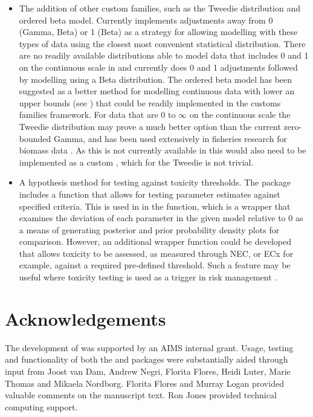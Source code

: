 \documentclass[
  shortnames]{jss}
\begin{document}
\begin{itemize}
\item
  The addition of other custom families, such as the Tweedie distribution and ordered beta model. Currently  implements adjustments away from 0 (Gamma, Beta) or 1 (Beta) as a strategy for allowing modelling with these types of data using the closest most convenient statistical distribution.
  There are no readily available distributions able to model data that includes 0 and 1 on the continuous scale in  and  currently does 0 and 1 adjustments followed by modelling using a Beta distribution. The ordered beta model has been suggested as a better method for modelling continuous data with lower an upper bounds (see \citet{Kubinec}) that could be readily implemented in the  customs families framework.
  For data that are 0 to \(\infty\) on the continuous scale the Tweedie distribution may prove a much better option than the current zero-bounded Gamma, and has been used extensively in fisheries research for biomass data \citep{Shono2008}. As this  is not currently available in  this would also need to be implemented as a custom , which for the Tweedie is not trivial.
\item
  A hypothesis method for testing against toxicity thresholds. The  package includes a  function that allows for testing parameter estimates against specified criteria. This is used in  in the  function, which is a wrapper that examines the deviation of each parameter in the given model relative to 0 as a means of generating posterior and prior probability density plots for comparison. However, an additional wrapper function could be developed that allows toxicity to be assessed, as measured through NEC, or ECx for example, against a required pre-defined threshold. Such a feature may be useful where toxicity testing is used as a trigger in risk management \citep[for example, using whole-effluent-toxicity (WET) testing,][]{Karman2019}.
\end{itemize}

\hypertarget{acknowledgements}{%
\section{Acknowledgements}\label{acknowledgements}}

The development of  was supported by an AIMS internal grant. Usage, testing and functionality of both the  and  packages were substantially aided through input from Joost van Dam, Andrew Negri, Florita Flores, Heidi Luter, Marie Thomas and Mikaela Nordborg. Florita Flores and Murray Logan provided valuable comments on the manuscript text. Ron Jones provided technical computing support.

\renewcommand\refname{References}

\end{document}
